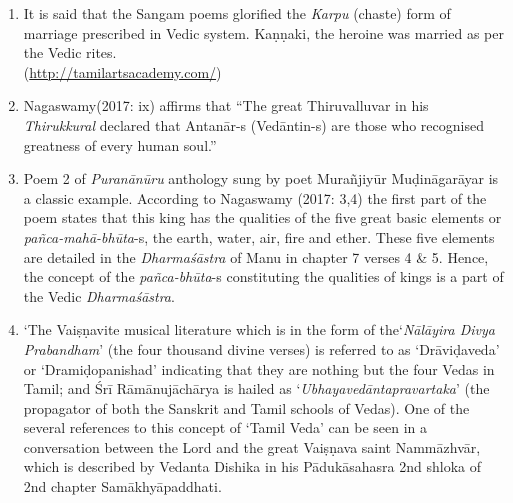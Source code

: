 \begin{enumerate}[{\rm 1.}]
\itemsep=0pt
\item It is said that the Sangam poems glorified the \textit{Karpu }(chaste) form of marriage prescribed in Vedic system. Kaṇṇaki, the heroine was married as per the Vedic rites.\\ (\url{http://tamilartsacademy.com/})

 \item Nagaswamy(2017: ix) affirms that “The great Thiruvalluvar in his \textit{Thirukkural} declared that Antanār-s (Vedāntin-s) are those who recognised greatness of every human soul.”

 \item Poem 2 of \textit{Puranānūru} anthology sung by poet Murañjiyūr Muḍināgarāyar is a classic example. According to Nagaswamy (2017: 3,4) the first part of the poem states that this king has the qualities of the five great basic elements or \textit{pañca-mahā-bhūta}-s, the earth, water, air, fire and ether. These five elements are detailed in the \textit{Dharmaśāstra} of Manu in chapter 7 verses 4 \& 5. Hence, the concept of the \textit{pañca-bhūta}-s constituting the qualities of kings is a part of the Vedic \textit{Dharmaśāstra}.

 \item 
 ‘The Vaiṣṇavite musical literature which is in the form of the\break ‘\textit{Nālāyira Divya Prabandham}’ (the four thousand divine verses) is referred to as ‘Drāviḍaveda’ or ‘Dramiḍopanishad’ indicating that they are nothing but the four Vedas in Tamil; and Śrī Rāmānujāchārya is hailed as ‘\textit{Ubhayavedāntapravartaka}’ (the propagator of both the Sanskrit and Tamil schools of Vedas). One of the several references to this concept of ‘Tamil Veda’ can be seen in a conversation between the Lord and the great Vaiṣṇava saint Nammāzhvār, which is described by Vedanta Dishika in his Pādukāsahasra 2nd shloka of 2nd chapter Samākhyāpaddhati.


\end{enumerate}
